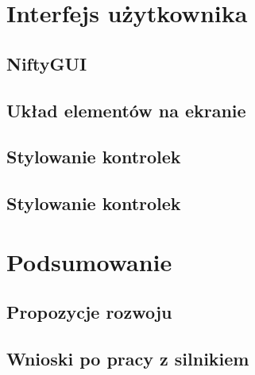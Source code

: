 \documentclass[]{report}
\begin{document}
\chapter*{Interfejs użytkownika}
\section{NiftyGUI}
\section{Układ elementów na ekranie}
\section{Stylowanie kontrolek}
\section{Stylowanie kontrolek}



\chapter*{Podsumowanie}
\section{Propozycje rozwoju}
\section{Wnioski po pracy z silnikiem}
\end{document}
